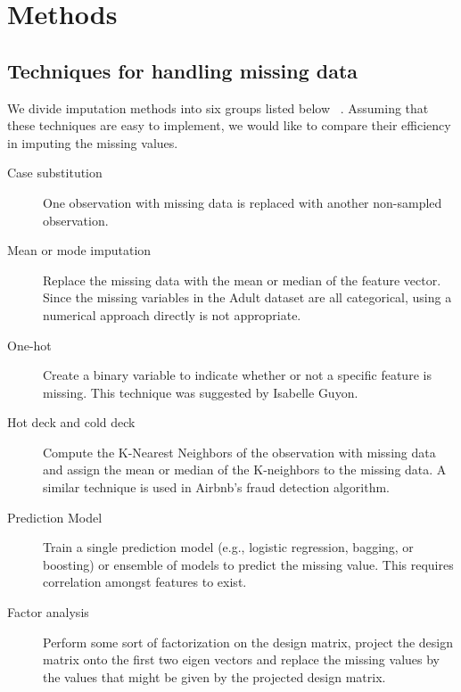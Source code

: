 \documentclass[10pt,twocolumn,letterpaper]{article}
\begin{document}

\section{Methods}


\subsection{Techniques for handling missing data}
We divide imputation methods into six groups listed
below ~\cite{batista2003analysis}. Assuming that these techniques are easy to
implement, we would like to compare their efficiency in imputing the missing
values.

\begin{description}
\item[Case substitution] One observation with missing data is replaced with
another non-sampled observation.
\item[Mean or mode imputation] Replace the missing data with the mean or median of
    the feature vector. Since the missing variables in the Adult dataset are
    all categorical, using a numerical approach directly is not appropriate.
\item[One-hot] Create a binary variable to indicate whether or not a specific
    feature is missing. This technique was suggested by Isabelle Guyon.
\item[Hot deck and cold deck] Compute the K-Nearest Neighbors of the
    observation with missing data and assign the mean or median of the K-neighbors
    to the missing data. A similar technique is used in Airbnb's fraud detection
    algorithm.
\item[Prediction Model] Train a single prediction model (e.g., logistic regression,  
    bagging, or boosting) or ensemble of models to predict the missing value. This
    requires correlation amongst features to exist.
\item[Factor analysis] Perform some sort of factorization on the design
    matrix, project the design matrix onto the first two eigen vectors and
    replace the missing values by the values that might be given by the
    projected design matrix.
\end{description}
\end{document}
